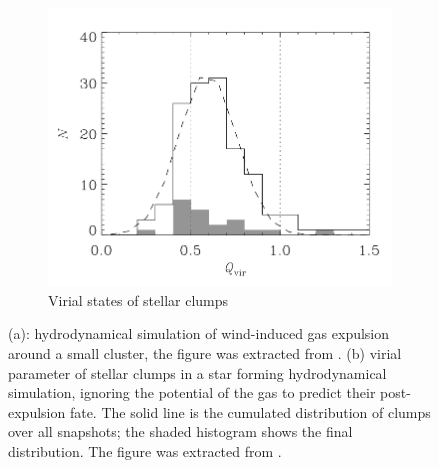\begin{figure}
\begin{subfigure}[b]{0.48\textwidth}
        \includegraphics[width=\textwidth]{Figures/0_virializedclumps.png}
        \caption{Virial states of stellar clumps}
        \label{Fig:0_ejection_2}
    \end{subfigure}
\caption[Simulation of gas expulsion and $Q$ distribution in clumps from a simulation]{(a): hydrodynamical simulation of wind-induced gas expulsion around a small cluster, the figure was extracted from \cite{Dale2013}. (b) virial parameter of stellar clumps in a star forming hydrodynamical simulation, ignoring the potential of the gas to predict their post-expulsion fate. The solid line is the cumulated distribution of clumps over all snapshots; the shaded histogram shows the final distribution. The figure was extracted from \cite{Kruijssen2012}.}
\label{Fig:0_clumps}
\end{figure}

